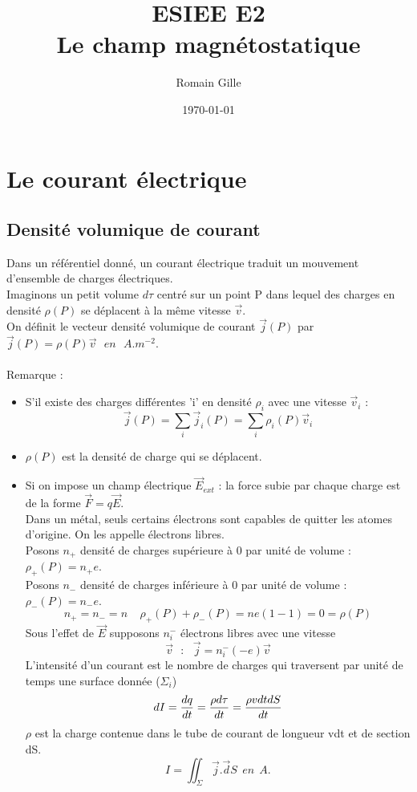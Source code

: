 \documentclass[11pt,a4paper,french]{article}
\title{ESIEE E2 \\ Le champ magnétostatique}
\author{Romain Gille}
\date{\today}
\begin{document}
\maketitle
\newpage
\section{Le courant électrique}
\subsection{Densité volumique de courant}
Dans un référentiel donné, un courant électrique traduit un mouvement d'ensemble de charges électriques. \\
Imaginons un petit volume $d\tau$ centré sur un point P dans lequel des charges en densité $\rho(P)$ se déplacent à la même vitesse $\vec v$. \\
On définit le vecteur densité volumique de courant $\vec j(P)$ par $\vec j(P) = \rho(P)\vec v ~~~en~~~ A.m^{-2}$. \\ \\
Remarque :
\begin{itemize}
\item S'il existe des charges différentes 'i' en densité $\rho_i$ avec une vitesse $\vec v_i$ :
$$\vec j(P) = \sum_i \vec j_i(P) = \sum_i \rho_i(P) \vec v_i$$
\item $\rho(P)$ est la densité de charge qui se déplacent.
\item Si on impose un champ électrique $\vec E_{ext}$ : la force subie par chaque charge est de la forme $\vec F = q \vec E$. \\
Dans un métal, seuls certains électrons sont capables de quitter les atomes d'origine. On les appelle électrons libres. \\
Posons $n_+$ densité de charges supérieure à 0 par unité de volume : 
$\rho_+(P) = n_+e$. \\
Posons $n_-$ densité de charges inférieure à 0 par unité de volume : $\rho_-(P) = n_-e$.
$$n_+ = n_- = n ~~~~~ \rho_+(P)+ \rho_-(P) = ne(1-1) = 0 = \rho(P)$$
Sous l'effet de $\vec E$ supposons $n_i^-$ électrons libres avec une vitesse $$\vec v~~~:~~~\vec j = n_i^-(-e)\vec v$$
L'intensité d'un courant est le nombre de charges qui traversent par unité de temps une surface donnée ($\Sigma_i$)
$$dI = {dq \over dt} = {\rho d\tau \over dt} = {\rho v dt dS \over dt}$$
$\rho$ est la charge contenue dans le tube de courant de longueur vdt et de section dS.
$$I = \iint_\Sigma \vec j.\vec dS ~~ en ~~A.$$
\end{itemize}
\newpage
\end{document}
